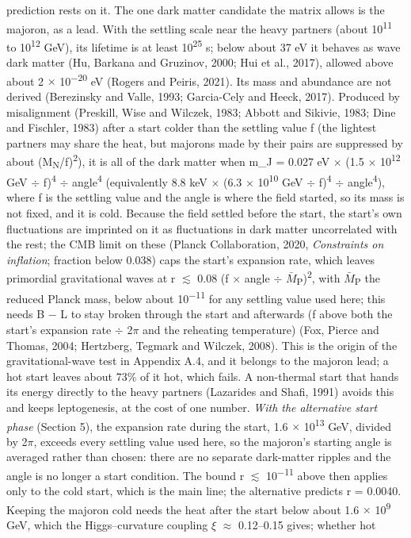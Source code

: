 \documentclass[
  11pt,
]{article}
\begin{document}
prediction rests on it. The one dark matter candidate the matrix allows is the majoron, as a lead. With the settling scale near the heavy partners (about 10\textsuperscript{11} to 10\textsuperscript{12} GeV), its lifetime is at least 10\textsuperscript{25} s; below about 37 eV it behaves as wave dark matter (Hu, Barkana and Gruzinov, 2000; Hui et al., 2017), allowed above about 2 \ensuremath{\times} 10\textsuperscript{\ensuremath{-}20} eV (Rogers and Peiris, 2021). Its mass and abundance are not derived (Berezinsky and Valle, 1993; Garcia-Cely and Heeck, 2017). Produced by misalignment (Preskill, Wise and Wilczek, 1983; Abbott and Sikivie, 1983; Dine and Fischler, 1983) after a start colder than the settling value f (the lightest partners may share the heat, but majorons made by their pairs are suppressed by about (M\textsubscript{N}/f)\textsuperscript{2}), it is all of the dark matter when m\_J = 0.027 eV \ensuremath{\times} (1.5 \ensuremath{\times} 10\textsuperscript{12} GeV \ensuremath{\div} f)\textsuperscript{4} \ensuremath{\div} angle\textsuperscript{4} (equivalently 8.8 keV \ensuremath{\times} (6.3 \ensuremath{\times} 10\textsuperscript{10} GeV \ensuremath{\div} f)\textsuperscript{4} \ensuremath{\div} angle\textsuperscript{4}), where f is the settling value and the angle is where the field started, so its mass is not fixed, and it is cold. Because the field settled before the start, the start's own fluctuations are imprinted on it as fluctuations in dark matter uncorrelated with the rest; the CMB limit on these (Planck Collaboration, 2020, \emph{Constraints on inflation}; fraction below 0.038) caps the start's expansion rate, which leaves primordial gravitational waves at r \ensuremath{\lesssim} 0.08 (f \ensuremath{\times} angle \ensuremath{\div} \ensuremath{\bar{M}}\textsubscript{P})\textsuperscript{2}, with \ensuremath{\bar{M}}\textsubscript{P} the reduced Planck mass, below about 10\textsuperscript{\ensuremath{-}11} for any settling value used here; this needs B \ensuremath{-} L to stay broken through the start and afterwards (f above both the start's expansion rate \ensuremath{\div} 2\ensuremath{\pi} and the reheating temperature) (Fox, Pierce and Thomas, 2004; Hertzberg, Tegmark and Wilczek, 2008). This is the origin of the gravitational-wave test in Appendix A.4, and it belongs to the majoron lead; a hot start leaves about 73\% of it hot, which fails. A non-thermal start that hands its energy directly to the heavy partners (Lazarides and Shafi, 1991) avoids this and keeps leptogenesis, at the cost of one number. \emph{With the alternative start phase} (Section 5), the expansion rate during the start, 1.6 \ensuremath{\times} 10\textsuperscript{13} GeV, divided by 2\ensuremath{\pi}, exceeds every settling value used here, so the majoron's starting angle is averaged rather than chosen: there are no separate dark-matter ripples and the angle is no longer a start condition. The bound r \ensuremath{\lesssim} 10\textsuperscript{\ensuremath{-}11} above then applies only to the cold start, which is the main line; the alternative predicts r = 0.0040. Keeping the majoron cold needs the heat after the start below about 1.6 \ensuremath{\times} 10\textsuperscript{9} GeV, which the Higgs--curvature coupling \ensuremath{\xi} \ensuremath{\approx} 0.12--0.15 gives; whether hot 
\end{document}
